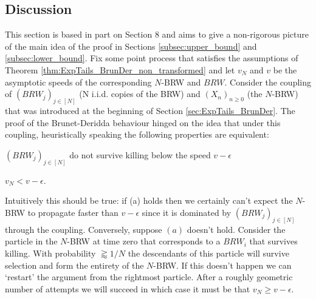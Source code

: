 \subsection{Discussion}
This section is based in part on \cite{exp_tails} Section 8 and aims to give a non-rigorous picture of the main idea of the proof in Sections \ref{subsec:upper_bound} and \ref{subsec:lower_bound}. Fix some point process that satisfies the assumptions of Theorem \ref{thm:ExpTails_BrunDer_non_transformed} and let $v_N$ and $v$ be the asymptotic speeds of the corresponding $N$-BRW and $BRW$. Consider the coupling of $(BRW_j)_{j \in [N]}$ (N i.i.d. copies of the BRW) and $(X_n)_{n \geq 0}$ (the $N$-BRW) that was introduced at the beginning of Section \ref{sec:ExpTails_BrunDer}. The proof of the Brunet-Deridda behaviour hinged on the idea that under this coupling, heuristically speaking the following properties are equivalent:
\begin{enumerate}[(a)]
{\item \vspace{-1mm} $(BRW_j)_{j \in [N]}$ do not survive killing below the speed $v - \epsilon$
\item \vspace{-3mm} $v_N < v - \epsilon$. }
\end{enumerate}
\vspace{-3mm}
Intuitively this should be true: if (a) holds then we certainly can't expect the $N$-BRW to propagate faster than $v - \epsilon$ since it is dominated by $(BRW_j)_{j \in [N]}$ through the coupling. Conversely, suppose $(a)$ doesn't hold. Consider the particle in the $N$-BRW at time zero that corresponds to a $BRW_i$ that survives killing. With probability $ \gtrapprox 1/N$ the descendants of this particle will survive selection and form the entirety of the $N$-BRW. If this doesn't happen we can `restart' the argument from the rightmost particle. After a roughly geometric number of attempts we will succeed in which case it must be that $v_N \geq v - \epsilon$. \\

